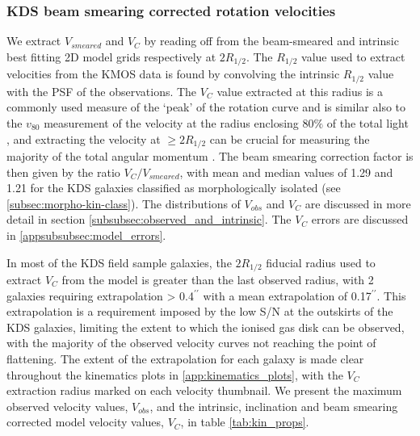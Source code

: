 \documentclass[fleqn,usenatbib]{mn2e}
\begin{document}
\subsubsection{KDS beam smearing corrected rotation velocities}\label{subsubsec:beam_smearing_corrected_velocities}
We extract $V_{smeared}$ and $V_{C}$ by reading off from the beam-smeared and intrinsic best fitting 2D model grids respectively at $2R_{1/2}$.
The $R_{1/2}$ value used to extract velocities from the KMOS data is found by convolving the intrinsic $R_{1/2}$ value with the PSF of the observations.
The $V_{C}$ value extracted at this radius is a commonly used measure of the `peak' of the rotation curve \citep[e.g.][]{Miller2011,Pelliccia2016,Stott2016,Harrison2017} and is similar also to the $v_{80}$ measurement of the velocity at the radius enclosing 80$\%$ of the total light \citep{Tiley2016a}, and extracting the velocity at $\geqslant 2R_{1/2}$ can be crucial for measuring the majority of the total angular momentum \citep[e.g.]{Obreschkow2015,Harrison2017}.
The beam smearing correction factor is then given by the ratio $V_{C}/V_{smeared}$, with mean and median values of 1.29 and 1.21 for the KDS galaxies classified as morphologically isolated (see \cref{subsec:morpho-kin-class}).
The distributions of $V_{obs}$ and $V_{C}$ are discussed in more detail in section \cref{subsubsec:observed_and_intrinsic}.
The $V_{C}$ errors are discussed in \cref{appsubsubsec:model_errors}.

In most of the KDS field sample galaxies, the $2R_{1/2}$ fiducial radius used to extract $V_{C}$ from the model is greater than the last observed radius, with 2 galaxies requiring extrapolation > 0.4$^{\prime\prime}$ with a mean extrapolation of 0.17$^{\prime\prime}$.
This extrapolation is a requirement imposed by the low S/N at the outskirts of the KDS galaxies, limiting the extent to which the ionised gas disk can be observed, with the majority of the observed velocity curves not reaching the point of flattening. 
The extent of the extrapolation for each galaxy is made clear throughout the kinematics plots in \cref{app:kinematics_plots}, with the $V_{C}$ extraction radius marked on each velocity thumbnail.
We present the maximum observed velocity values, $V_{obs}$, and the intrinsic, inclination and beam smearing corrected model velocity values, $V_{C}$, in table \ref{tab:kin_props}.
\end{document}
